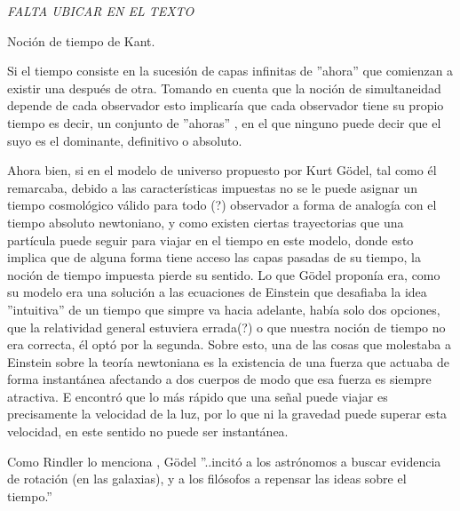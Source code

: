 \documentclass[11pt]{book}
\begin{document}
\vspace{3em}


\emph{FALTA UBICAR EN EL TEXTO}

Noción de tiempo de Kant.

Si el tiempo consiste en la sucesión de capas infinitas de ''ahora'' que comienzan a existir una después de otra. Tomando en cuenta que la noción de simultaneidad depende de cada observador esto implicaría que cada observador tiene su propio tiempo es decir, un conjunto de ''ahoras'' \cite{remark}, en el que ninguno puede decir que el suyo es el dominante, definitivo o absoluto.

Ahora bien, si en el modelo de universo propuesto por Kurt Gödel, tal como él remarcaba, debido a las características impuestas no se le puede asignar un tiempo cosmológico válido para todo (?) observador a forma de analogía con el tiempo absoluto newtoniano, y como existen ciertas trayectorias que una partícula puede seguir para viajar en el tiempo en este modelo, donde esto implica que de alguna forma tiene acceso las capas pasadas de su tiempo, la noción de tiempo impuesta pierde su sentido.
Lo que Gödel proponía era, como su modelo era una solución a las ecuaciones de Einstein que desafiaba la idea ''intuitiva'' de un tiempo que simpre va hacia adelante, había solo dos opciones, que la relatividad general estuviera errada(?) o que nuestra noción de tiempo no era correcta, él optó por la segunda.
% 
Sobre esto, una de las cosas que molestaba a Einstein sobre la teoría newtoniana es la existencia de una fuerza que actuaba de forma instantánea afectando a dos cuerpos de modo que esa fuerza es siempre atractiva. E encontró que lo más rápido que una señal puede viajar es precisamente la velocidad de la luz, por lo que ni la gravedad puede superar esta velocidad, en este sentido no puede ser instantánea. 

Como Rindler lo menciona \cite{rindler}, Gödel ''..incitó a los astrónomos a buscar evidencia de rotación (en las galaxias), y a los filósofos a repensar las ideas sobre el tiempo.'' 
%
\end{document}
